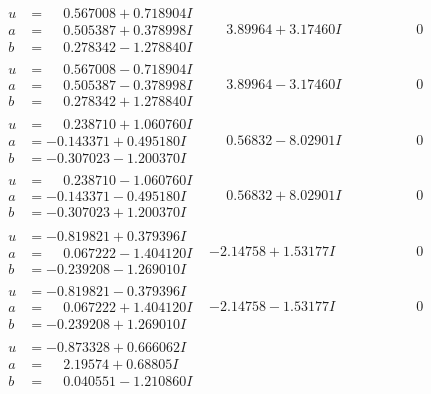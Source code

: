 \documentclass[1p]{elsarticle_modified}
\theoremstyle{definition}
\begin{document}
$$\begin{array}{c|c|c}
\begin{aligned}
u &= \phantom{-}0.567008 + 0.718904 I \\
a &= \phantom{-}0.505387 + 0.378998 I \\
b &= \phantom{-}0.278342 - 1.278840 I\end{aligned}
 & \phantom{-}3.89964 + 3.17460 I & \phantom{-0.000000 } 0 \\ \hline\begin{aligned}
u &= \phantom{-}0.567008 - 0.718904 I \\
a &= \phantom{-}0.505387 - 0.378998 I \\
b &= \phantom{-}0.278342 + 1.278840 I\end{aligned}
 & \phantom{-}3.89964 - 3.17460 I & \phantom{-0.000000 } 0 \\ \hline\begin{aligned}
u &= \phantom{-}0.238710 + 1.060760 I \\
a &= -0.143371 + 0.495180 I \\
b &= -0.307023 - 1.200370 I\end{aligned}
 & \phantom{-}0.56832 - 8.02901 I & \phantom{-0.000000 } 0 \\ \hline\begin{aligned}
u &= \phantom{-}0.238710 - 1.060760 I \\
a &= -0.143371 - 0.495180 I \\
b &= -0.307023 + 1.200370 I\end{aligned}
 & \phantom{-}0.56832 + 8.02901 I & \phantom{-0.000000 } 0 \\ \hline\begin{aligned}
u &= -0.819821 + 0.379396 I \\
a &= \phantom{-}0.067222 - 1.404120 I \\
b &= -0.239208 - 1.269010 I\end{aligned}
 & -2.14758 + 1.53177 I & \phantom{-0.000000 } 0 \\ \hline\begin{aligned}
u &= -0.819821 - 0.379396 I \\
a &= \phantom{-}0.067222 + 1.404120 I \\
b &= -0.239208 + 1.269010 I\end{aligned}
 & -2.14758 - 1.53177 I & \phantom{-0.000000 } 0 \\ \hline\begin{aligned}
u &= -0.873328 + 0.666062 I \\
a &= \phantom{-}2.19574 + 0.68805 I \\
b &= \phantom{-}0.040551 - 1.210860 I\end{aligned}

\end{array}$$
\end{document}
